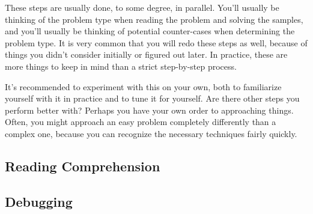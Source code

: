 These steps are usually done, to some degree, in parallel. You'll usually be thinking of the problem type when reading the problem and solving the samples, and you'll usually be thinking of potential counter-cases when determining the problem type. It is very common that you will redo these steps as well, because of things you didn't consider initially or figured out later. In practice, these are more things to keep in mind than a strict step-by-step process.

It's recommended to experiment with this on your own, both to familiarize yourself with it in practice and to tune it for yourself. Are there other steps you perform better with? Perhaps you have your own order to approaching things. Often, you might approach an easy problem completely differently than a complex one, because you can recognize the necessary techniques fairly quickly.

\subsection{Reading Comprehension}
\subsection{Debugging}
